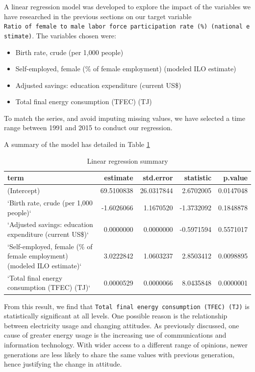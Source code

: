 \documentclass[11pt,a4paper,]{article}
\providecommand{\tightlist}{%
  \setlength{\itemsep}{0pt}\setlength{\parskip}{0pt}}
\begin{document}
A linear regression model was developed to explore the impact of the
variables we have researched in the previous sections on our target
variable
\texttt{Ratio\ of\ female\ to\ male\ labor\ force\ participation\ rate\ (\%)\ (national\ estimate)}.
The variables chosen were:

\begin{itemize}
\tightlist
\item
  Birth rate, crude (per 1,000 people)
\item
  Self-employed, female (\% of female employment) (modeled ILO estimate)
\item
  Adjusted savings: education expenditure (current US\$)
\item
  Total final energy consumption (TFEC) (TJ)
\end{itemize}

To match the series, and avoid imputing missing values, we have selected
a time range between 1991 and 2015 to conduct our regression.

A summary of the model has detailed in Table \ref{tab:model-summary}

\begin{table}[!h]

\caption{\label{tab:model-summary}Linear regression summary}
\centering
\fontsize{7}{9}\selectfont
\begin{tabular}[t]{lrrrr}
\toprule
term & estimate & std.error & statistic & p.value\\
\midrule
(Intercept) & 69.5100838 & 26.0317844 & 2.6702005 & 0.0147048\\
`Birth rate, crude (per 1,000 people)` & -1.6026066 & 1.1670520 & -1.3732092 & 0.1848878\\
`Adjusted savings: education expenditure (current US\$)` & 0.0000000 & 0.0000000 & -0.5971594 & 0.5571017\\
`Self-employed, female (\% of female employment) (modeled ILO estimate)` & 3.0222842 & 1.0603237 & 2.8503412 & 0.0098895\\
`Total final energy consumption (TFEC) (TJ)` & 0.0000529 & 0.0000066 & 8.0435848 & 0.0000001\\
\bottomrule
\end{tabular}
\end{table}

From this result, we find that
\texttt{Total\ final\ energy\ consumption\ (TFEC)\ (TJ)} is
statistically significant at all levels. One possible reason is the
relationship between electricity usage and changing attitudes. As
previously discussed, one cause of greater energy usage is the
increasing use of communications and information technology. With wider
access to a different range of opinions, newer generations are less
likely to share the same values with previous generation, hence
justifying the change in attitude.
\end{document}
